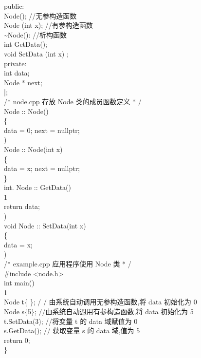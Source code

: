 \documentclass[10pt]{article}
\begin{document}
public:\\
Node(); //无参构造函数\\
Node (int x); //有参构造函数\\
\~{}Node(): //析构函数\\
int GetData();\\
void SetData (int x) ;\\
private:\\
int data;\\
Node * next;\\
|;\\
/* node.cpp 存放 Node 类的成员函数定义 * /\\
Node :: Node()\\
\{\\
data = 0; next = nullptr;\\
)\\
Node :: Node(int x)\\
\{\\
data = x; next = nullptr;\\
\}\\
int. Node :: GetData()\\
1\\
return data;\\
)\\
void Node :: SetData(int x)\\
\{\\
data = x;\\
)\\
/* example.cpp 应用程序使用 Node 类 * /\\
\#include <node.h>\\
int main()\\
1\\
Node t\{ \}; / / 由系统自动调用无参构造函数,将 data 初始化为 0\\
Node s\{5\}; //由系统自动週用有参构造函数,将 data 初始化为 5\\
t.SetData(3); //将变量 t 的 data 域赋值为 0\\
s.GetData(); // 获取变量 s 的 data 域,值为 5\\
return 0;\\
\}
\end{document}
